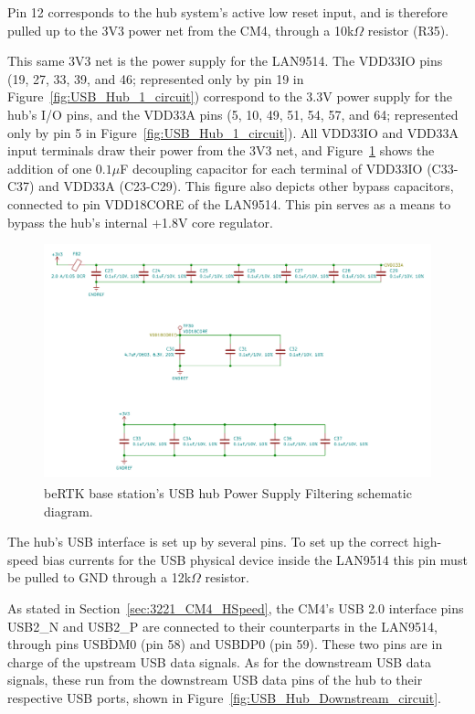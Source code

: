 Pin 12 corresponds to the hub system's active low reset input, and is therefore pulled up to the 3V3 power net from the CM4, through a 10k$\Omega$ resistor (R35).

This same 3V3 net is the power supply for the LAN9514. The VDD33IO pins (19, 27, 33, 39, and 46; represented only by pin 19 in Figure~\ref{fig:USB_Hub_1_circuit}) correspond to the 3.3V power supply for the hub's I/O pins, and the VDD33A pins (5, 10, 49, 51, 54, 57, and 64; represented only by pin 5 in Figure~\ref{fig:USB_Hub_1_circuit}). All VDD33IO and VDD33A input terminals draw their power from the 3V3 net, and Figure~\ref{fig:USB_Hub_PwrSplyFiltering_circuit} shows the addition of one $0.1 \mu$F decoupling capacitor for each terminal of VDD33IO (C33-C37) and VDD33A (C23-C29). This figure also depicts other bypass capacitors, connected to pin VDD18CORE of the LAN9514. This pin serves as a means to bypass the hub's internal +1.8V core regulator.

\begin{figure}[h]
	\centering
	\includegraphics[width=1.0\textwidth]{Chapters/Figures/chapter3/USB_Hub_PwrSplyFiltering.pdf}
	\caption{beRTK\textsuperscript{\textregistered} base station's USB hub Power Supply Filtering schematic diagram.}
	\label{fig:USB_Hub_PwrSplyFiltering_circuit}
\end{figure}

The hub's USB interface is set up by several pins. To set up the correct high-speed bias currents for the USB physical device inside the LAN9514 this pin must be pulled to GND through a 12k$\Omega$ resistor.

As stated in Section~\ref{sec:3221_CM4_HSpeed}, the CM4's USB 2.0 interface pins USB2\_N and USB2\_P are connected to their counterparts in the LAN9514, through pins $\overline{\mbox{USBDM0}}$ (pin 58) and USBDP0 (pin 59). These two pins are in charge of the upstream USB data signals. As for the downstream USB data signals, these run from the downstream USB data pins of the hub to their respective USB ports, shown in Figure~\ref{fig:USB_Hub_Downstream_circuit}.


